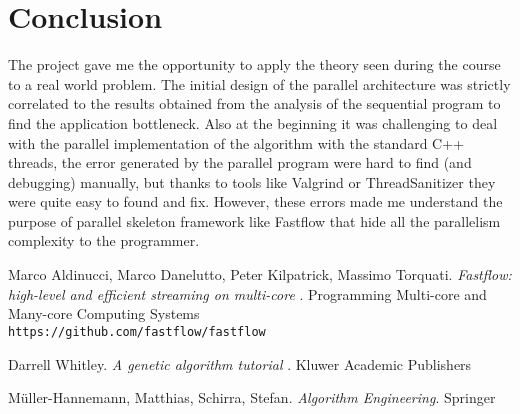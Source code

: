 \section{Conclusion}
The project gave me the opportunity to apply the theory seen during the course to a real world problem. The initial design of the parallel architecture was strictly correlated to the results obtained from the analysis of the sequential program to find the application bottleneck. Also at the beginning it was challenging to deal with the parallel implementation of the algorithm with the standard C++ threads, the error generated by the parallel program were hard to find (and debugging) manually, but thanks to tools like Valgrind or ThreadSanitizer they were quite easy to found and fix. However, these errors made me understand the purpose of parallel skeleton framework like Fastflow that hide all the parallelism complexity to the programmer. 

\begin{thebibliography}{9}
	
	Marco Aldinucci, Marco Danelutto, Peter Kilpatrick, Massimo Torquati.
	\textit{Fastflow: high-level and efficient streaming on multi-core }. Programming Multi-core and Many-core Computing Systems
	\\\texttt{https://github.com/fastflow/fastflow}
	
	Darrell Whitley.
	\textit{A genetic algorithm tutorial }. Kluwer Academic Publishers
	
	Müller-Hannemann, Matthias, Schirra, Stefan.
	\textit{Algorithm Engineering}. Springer
	
	
\end{thebibliography} 